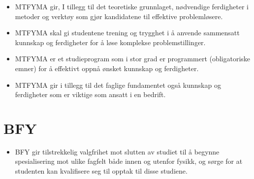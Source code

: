 \begin{itemize}
	\item MTFYMA gir, I tillegg til det teoretiske grunnlaget, nødvendige ferdigheter i metoder og verktøy som gjør kandidatene til effektive problemløsere.
	\item MTFYMA skal gi studentene trening og trygghet i å anvende sammensatt kunnskap og ferdigheter for å løse komplekse problemstillinger.
	\item MTFYMA er et studieprogram som i stor grad er programmert (obligatoriske emner) for å effektivt oppnå ønsket kunnskap og ferdigheter.
	\item MTFYMA gir i tillegg til det faglige fundamentet også kunnskap og ferdigheter som er viktige som ansatt i en bedrift.
\end{itemize}

\section{BFY}
\begin{itemize}
	\item BFY gir tilstrekkelig valgfrihet mot slutten av studiet til å begynne spesialisering mot ulike fagfelt både innen og utenfor fysikk, og sørge for at studenten kan kvalifisere seg til opptak til disse studiene.
\end{itemize}

